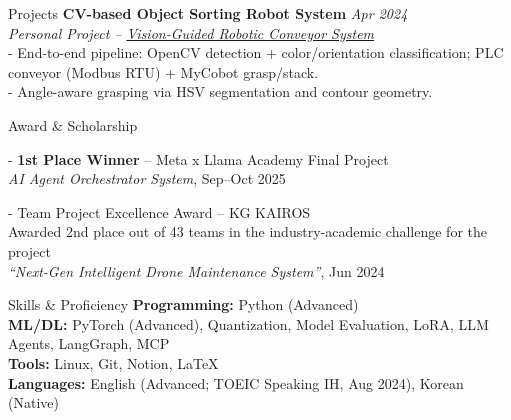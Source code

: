 \documentclass{resume} %
\begin{document}
\begin{rSection}{Projects}
{\bf CV-based Object Sorting Robot System} \hfill {\em Apr 2024} 
\\{\textit{Personal Project – \href{https://disco-candy-c65.notion.site/1ec2d399f911805f85eff13c9392050b?pvs=74}{Vision-Guided Robotic Conveyor System}}}
\\- End-to-end pipeline: OpenCV detection + color/orientation classification; PLC conveyor (Modbus RTU) + MyCobot grasp/stack. \\
- Angle-aware grasping via HSV segmentation and contour geometry. 

\end{rSection}


\begin{rSection}{Award \& Scholarship}

- \textbf{1st Place Winner} – Meta x Llama Academy Final Project \\
\hspace{1em}\textit{AI Agent Orchestrator System}, Sep--Oct 2025

- Team Project Excellence Award – KG KAIROS \\
\hspace{1em}Awarded 2nd place out of 43 teams in the industry-academic challenge for the project \\
\hspace{1em}\textit{``Next-Gen Intelligent Drone Maintenance System''}, Jun 2024

\end{rSection}


\begin{rSection}{Skills \& Proficiency}
\textbf{Programming:} Python (Advanced) \\
\textbf{ML/DL:} PyTorch (Advanced), Quantization, Model Evaluation, LoRA, LLM Agents, LangGraph, MCP \\
\textbf{Tools:} Linux, Git, Notion, LaTeX \\
\textbf{Languages:} English (Advanced; TOEIC Speaking IH, Aug 2024), Korean (Native)
\end{rSection}
\end{document}
